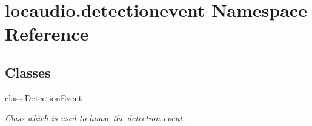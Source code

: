 \hypertarget{namespacelocaudio_1_1detectionevent}{\section{locaudio.\-detectionevent Namespace Reference}
\label{namespacelocaudio_1_1detectionevent}
}
\subsection*{Classes}
\begin{DoxyCompactItemize}
\item 
class \hyperlink{classlocaudio_1_1detectionevent_1_1DetectionEvent}{Detection\-Event}
\begin{DoxyCompactList}\small\item\em Class which is used to house the detection event. \end{DoxyCompactList}\end{DoxyCompactItemize}
